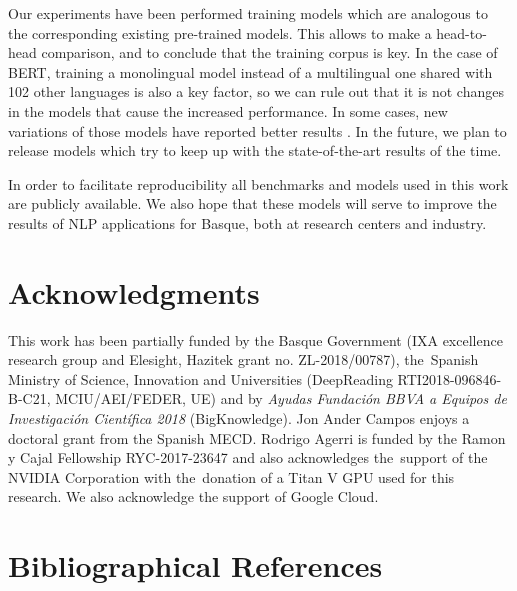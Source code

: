 \documentclass[10pt, a4paper]{article}
\begin{document}
Our experiments have been performed training models which are analogous to the corresponding existing pre-trained models. This allows to make a head-to-head comparison, and to conclude that the training corpus is key. In the case of BERT, training a monolingual model instead of a multilingual one shared with 102 other languages is also a key factor, so we can rule out that it is not changes in the models that cause the increased performance. In some cases, new variations of those models have reported better results \cite{liu2019roberta}. In the future, we plan to release models which try to keep up with the state-of-the-art results of the time.   

In order to facilitate reproducibility all benchmarks and models used in this work are publicly available. We also hope that these models will serve to improve the results of NLP applications for Basque, both at research centers and industry. 




\section{Acknowledgments}

This work has been partially funded by the Basque Government (IXA excellence research group and Elesight, Hazitek grant no. ZL-2018/00787), the~Spanish Ministry of Science, Innovation and Universities (DeepReading RTI2018-096846-B-C21, MCIU/AEI/FEDER, UE) and by \textit{Ayudas Fundación BBVA a Equipos de Investigación Científica 2018} (BigKnowledge).  Jon Ander Campos enjoys a doctoral grant from the Spanish MECD.  Rodrigo Agerri is funded by the Ramon y Cajal Fellowship RYC-2017-23647 and also acknowledges the~support of the NVIDIA Corporation with the~donation of a Titan V GPU used for this research. We also acknowledge the support of Google Cloud.

\section{Bibliographical References}



\end{document}
